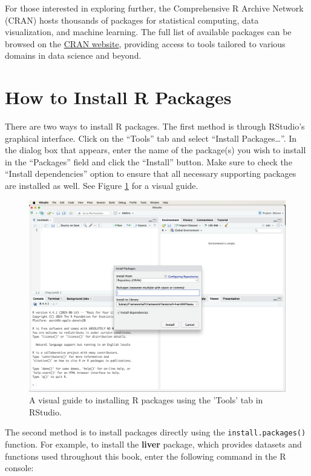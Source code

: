 \documentclass[
]{book}
\newcommand{\passthrough}[1]{#1}
\theoremstyle{definition}
\theoremstyle{definition}
\theoremstyle{definition}
\theoremstyle{definition}
\theoremstyle{remark}
\begin{document}
For those interested in exploring further, the Comprehensive R Archive Network (CRAN) hosts thousands of packages for statistical computing, data visualization, and machine learning. The full list of available packages can be browsed on the \href{https://CRAN.R-project.org}{CRAN website}, providing access to tools tailored to various domains in data science and beyond.

\section{How to Install R Packages}\label{install-packages}

There are two ways to install R packages. The first method is through RStudio's graphical interface. Click on the ``Tools'' tab and select ``Install Packages\ldots{}''. In the dialog box that appears, enter the name of the package(s) you wish to install in the ``Packages'' field and click the ``Install'' button. Make sure to check the ``Install dependencies'' option to ensure that all necessary supporting packages are installed as well. See Figure \ref{fig:install-packages} for a visual guide.

\begin{figure}

{\centering \includegraphics[width=0.7\linewidth]{images/RStudio-window-install} 

}

\caption{A visual guide to installing R packages using the 'Tools' tab in RStudio.}\label{fig:install-packages}
\end{figure}

The second method is to install packages directly using the \passthrough{\lstinline!install.packages()!} function. For example, to install the \textbf{liver} package, which provides datasets and functions used throughout this book, enter the following command in the R console:
\end{document}
